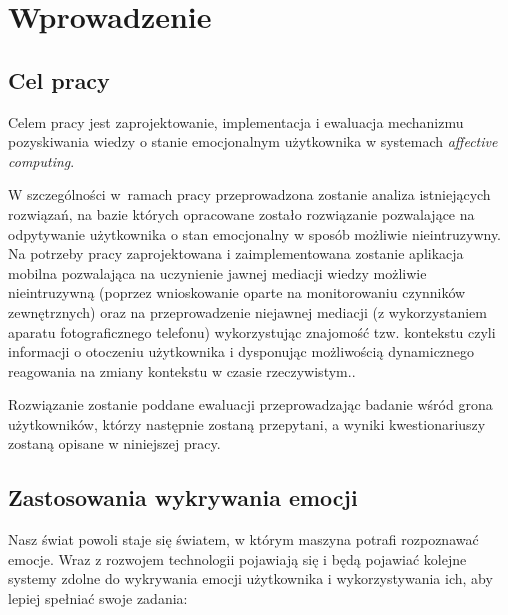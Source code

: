 \chapter{Wprowadzenie}
\label{cha:wprowadzenie}


\section{Cel pracy}
\label{sec:celPracy}

Celem pracy jest zaprojektowanie, implementacja i ewaluacja mechanizmu pozyskiwania wiedzy o  stanie emocjonalnym użytkownika w systemach \textit{affective computing}.

W szczególności w~ramach pracy przeprowadzona zostanie analiza istniejących rozwiązań, na bazie których opracowane zostało rozwiązanie pozwalające na odpytywanie użytkownika o stan emocjonalny w sposób możliwie nieintruzywny.  Na potrzeby pracy zaprojektowana i zaimplementowana zostanie aplikacja mobilna pozwalająca na uczynienie jawnej mediacji wiedzy możliwie nieintruzywną (poprzez wnioskowanie oparte na monitorowaniu czynników zewnętrznych) oraz na przeprowadzenie niejawnej mediacji (z wykorzystaniem aparatu fotograficznego telefonu) wykorzystując znajomość tzw. kontekstu czyli informacji o otoczeniu użytkownika i dysponując możliwością dynamicznego reagowania na zmiany kontekstu w czasie rzeczywistym.. 

Rozwiązanie zostanie poddane ewaluacji przeprowadzając badanie wśród grona użytkowników, którzy następnie zostaną przepytani, a wyniki kwestionariuszy zostaną opisane w niniejszej pracy.



\section{Zastosowania wykrywania emocji}
\label{sec:zastosowaniaWykrywaniaEmocji}

Nasz świat powoli staje się światem, w którym maszyna potrafi rozpoznawać emocje. Wraz z rozwojem technologii pojawiają się i będą pojawiać kolejne systemy zdolne do wykrywania emocji użytkownika i wykorzystywania ich, aby lepiej spełniać swoje zadania:

